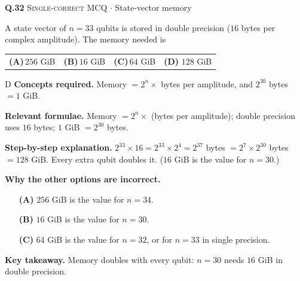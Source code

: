 \documentclass[11pt,a4paper]{article}
\newcommand{\optlabel}[1]{\textbf{(#1)}}
\newcommand{\correctlabel}[1]{\textcolor{okgreen}{\textbf{(#1)}\,\ding{51}}}
\newenvironment{qitem}[1]{\begin{list}{}{\setlength{\leftmargin}{3.3em}\setlength{\labelwidth}{3.1em}%
  \setlength{\labelsep}{0.2em}\setlength{\topsep}{3pt}\setlength{\parsep}{3pt}}\item[\textbf{Q.#1}\hfill]}{\end{list}}
\newcommand{\qsep}{\par\vspace{2pt}{\color{black!15}\hrule}\vspace{4pt}}
\newcommand{\qmeta}[2]{{\footnotesize\color{black!60}\textsc{#1} \;$\cdot$\; #2}\par}
\begin{document}
\begin{qitem}{32}
\qmeta{Single-correct MCQ}{State-vector memory}
A state vector of $n = 33$ qubits is stored in double precision ($16$ bytes per complex amplitude). The memory needed is
\par\smallskip\noindent\begin{tabularx}{\linewidth}{@{}*{4}{L}@{}}
\optlabel{A}\,$256$ GiB & \optlabel{B}\,$16$ GiB & \optlabel{C}\,$64$ GiB & \correctlabel{D}\,$128$ GiB
\end{tabularx}
\end{qitem}
\begin{solbox}{D}
\textbf{\color{brand}Concepts required.} Memory $= 2^n \times$ bytes per amplitude, and $2^{30}$ bytes $= 1$ GiB.

\textbf{\color{brand}Relevant formulae.} Memory $= 2^n\times$ (bytes per amplitude); double precision uses $16$ bytes; $1$ GiB $= 2^{30}$ bytes.

\textbf{\color{brand}Step-by-step explanation.} $2^{33}\times 16 = 2^{33}\times 2^{4} = 2^{37}$ bytes $= 2^{7}\times 2^{30}$ bytes $= 128$ GiB. Every extra qubit doubles it. ($16$ GiB is the value for $n = 30$.)

\textbf{\color{brand}Why the other options are incorrect.}
\begin{itemize}[leftmargin=2.4em, itemsep=1pt, topsep=2pt]
\item[\textbf{(A)}] $256$ GiB is the value for $n = 34$.
\item[\textbf{(B)}] $16$ GiB is the value for $n = 30$.
\item[\textbf{(C)}] $64$ GiB is the value for $n = 32$, or for $n = 33$ in single precision.
\end{itemize}
\textbf{\color{brand}Key takeaway.} Memory doubles with every qubit: $n = 30$ needs $16$ GiB in double precision.
\end{solbox}
\qsep
\end{document}
